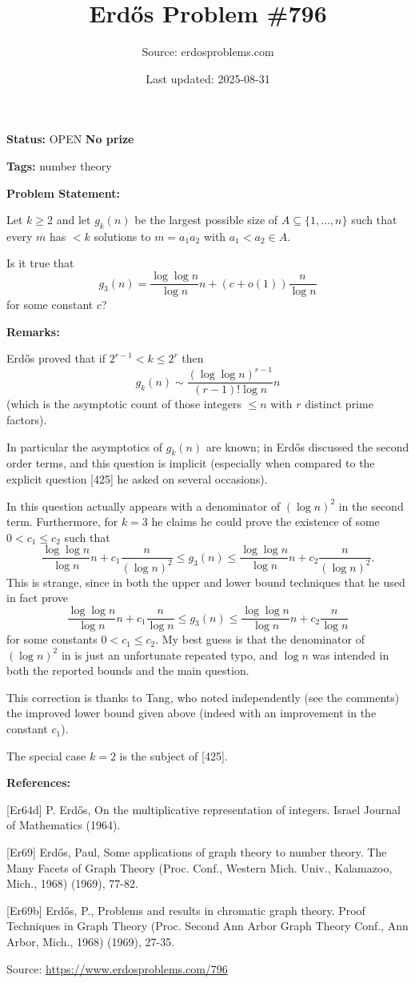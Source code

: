 \documentclass{article}
\title{Erd\H{o}s Problem \#796}
\date{Last updated: 2025-08-31}
\author{Source: erdosproblems.com}
\begin{document}
\maketitle

\noindent\textbf{Status:} OPEN \quad \textbf{No prize}

\noindent\textbf{Tags:} number theory

\medskip
\noindent\textbf{Problem Statement:}

Let $k\geq 2$ and let $g_k(n)$ be the largest possible size of $A\subseteq \{1,\ldots,n\}$ such that every $m$ has $<k$ solutions to $m=a_1a_2$ with $a_1<a_2\in A$.

Is it true that\[g_3(n)=\frac{\log\log n}{\log n}n+(c+o(1))\frac{n}{\log n}\]for some constant $c$?

\bigskip
\noindent\textbf{Remarks:}

Erd\H{o}s \cite{Er64d} proved that if $2^{r-1}<k\leq 2^r$ then\[g_k(n) \sim \frac{(\log\log n)^{r-1}}{(r-1)!\log n}n\](which is the asymptotic count of those integers $\leq n$ with $r$ distinct prime factors).

In particular the asymptotics of $g_k(n)$ are known; in \cite{Er69b} Erd\H{o}s discussed the second order terms, and this question is implicit (especially when compared to the explicit question [425] he asked on several occasions). 

In \cite{Er69} this question actually appears with a denominator of $(\log n)^2$ in the second term. Furthermore, for $k=3$ he claims he could prove the existence of some $0<c_1\leq c_2$ such that\[\frac{\log\log n}{\log n}n+c_1\frac{n}{(\log n)^2}\leq g_3(n)\leq \frac{\log\log n}{\log n}n+c_2\frac{n}{(\log n)^2}.\]This is strange, since in \cite{Er64d} both the upper and lower bound techniques that he used in fact prove\[\frac{\log\log n}{\log n}n+c_1\frac{n}{\log n}\leq g_3(n)\leq \frac{\log\log n}{\log n}n+c_2\frac{n}{\log n}\]for some constants $0<c_1\leq c_2$. My best guess is that the denominator of $(\log n)^2$ in \cite{Er69} is just an unfortunate repeated typo, and $\log n$ was intended in both the reported bounds and the main question.

This correction is thanks to Tang, who noted independently (see the comments) the improved lower bound given above (indeed with an improvement in the constant $c_1$).

The special case $k=2$ is the subject of [425].

\bigskip
\noindent\textbf{References:}

[Er64d] P. Erd\H{o}s, On the multiplicative representation of integers. Israel Journal of Mathematics (1964).
 
 [Er69] Erd\H{o}s, Paul, Some applications of graph theory to number theory. The Many Facets of Graph Theory (Proc. Conf.,
Western Mich. Univ., Kalamazoo, Mich., 1968) (1969), 77-82.
 
 [Er69b] Erd\H{o}s, P., Problems and results in chromatic graph theory. Proof Techniques in Graph Theory (Proc. Second Ann
Arbor Graph Theory Conf., Ann Arbor, Mich.,
1968) (1969), 27-35.

\bigskip
\noindent\small{Source: \url{https://www.erdosproblems.com/796}}
\end{document}

